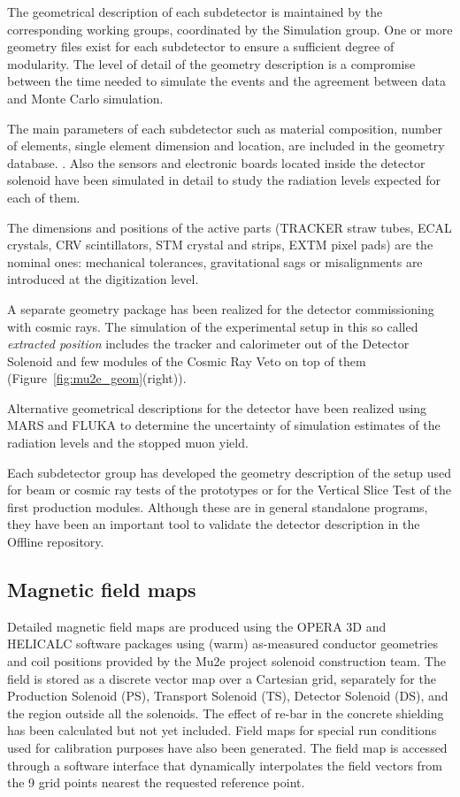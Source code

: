 The geometrical description of each subdetector is maintained by the corresponding working groups, coordinated by the Simulation group. One or more geometry files exist for each subdetector to ensure a sufficient degree of modularity. The level of detail of the geometry description is a compromise between the time needed to simulate the events and the agreement between data and Monte Carlo simulation.

The main parameters of each subdetector such as material composition, number of elements, single element dimension and location, are included in the geometry database. . Also the sensors and electronic boards located inside the detector solenoid have been simulated in detail to study the radiation levels expected for each of them.  

The dimensions and positions of the active parts (TRACKER straw tubes, ECAL crystals, CRV scintillators, STM crystal and strips, EXTM pixel pads)  are the nominal ones: mechanical tolerances, gravitational sags or misalignments are introduced at the digitization level.

A separate geometry package has been realized for the detector commissioning with cosmic rays.  The simulation of the experimental setup  in this so called {\em extracted position} includes the tracker and calorimeter out of the Detector Solenoid and few modules of the Cosmic Ray Veto on top of them (Figure~\ref{fig:mu2e_geom}(right)).

Alternative geometrical descriptions for the detector have been realized using MARS and FLUKA to determine the uncertainty of simulation estimates of the radiation levels and the stopped muon yield.

Each subdetector group has developed the geometry description of the setup used for beam or cosmic ray tests of the prototypes or for the Vertical Slice Test of the first production modules. Although these are in general standalone programs, they have been an important tool to validate the detector description in the Offline repository.  

\subsection{ Magnetic field maps}

Detailed magnetic field maps are produced using the OPERA 3D \cite{opera3D} and HELICALC \cite{helicalc}  software packages using (warm) as-measured conductor geometries and coil positions provided by the Mu2e project solenoid construction team.  The field is stored as a discrete vector map over a Cartesian grid, separately for the Production Solenoid (PS), Transport Solenoid (TS), Detector Solenoid (DS), and the region outside all the solenoids.  The effect of re-bar in the concrete shielding has been calculated but not yet included.  Field maps for special run conditions used for calibration purposes have also been generated. The field map is accessed through a software interface that dynamically interpolates the field vectors from the 9 grid points nearest the requested reference point.

